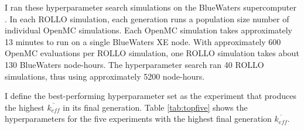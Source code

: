 I ran these hyperparameter search simulations on the BlueWaters supercomputer 
\cite{ncsa_about_2017}. 
In each \gls{ROLLO} simulation, each generation runs a population size number 
of individual OpenMC simulations. 
Each OpenMC simulation takes approximately 13 minutes to run on a single BlueWaters 
XE node. 
With approximately 600 OpenMC evaluations per \gls{ROLLO} simulation, one
\gls{ROLLO} simulation takes about 130 BlueWaters node-hours. 
The hyperparameter search ran 40 \gls{ROLLO} simulations, thus using approximately
5200 node-hours.

I define the best-performing hyperparameter set as the experiment that produces 
the highest $\overline{k_{eff}}$ in its final generation. 
Table \ref{tab:topfive} shows the hyperparameters for the five experiments 
with the highest final generation $\overline{k_{eff}}$.
\begin{table}[htbp]
    \centering
    \onehalfspacing
    \caption{Control parameters, $k_{eff}$ results, and hyperparameter values for 
    the five hyperparameter search experiments with the highest final generation 
    $\overline{k_{eff}}$.}
	\label{tab:topfive}
    \scriptsize
\end{table}
